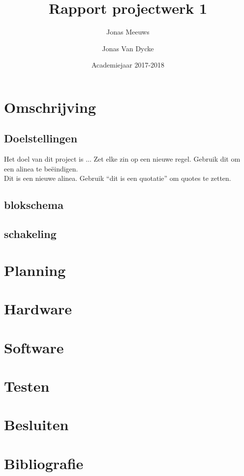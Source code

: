 \documentclass[a4paper]{report}
\title{Rapport projectwerk 1}
\author{Jonas Meeuws \and Jonas Van Dycke}
\date{Academiejaar 2017-2018}
\begin{document}
\maketitle
\tableofcontents

\chapter{Omschrijving}
\section{Doelstellingen}
Het doel van dit project is ...
Zet elke zin op een nieuwe regel.
Gebruik dit om een alinea te beëindigen.\\

Dit is een nieuwe alinea.
Gebruik ``dit is een quotatie'' om quotes te zetten.

\section{blokschema}
\section{schakeling}

\chapter{Planning}

\chapter{Hardware}

\chapter{Software}

\chapter{Testen}

\chapter{Besluiten}

\chapter{Bibliografie}
\end{document}
